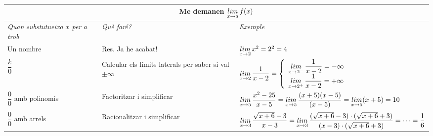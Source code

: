 \pagebreak
\begin{center}
	
	
	\setlength\LTleft{0pt}
	\setlength\LTright{0pt}
	\fontsize{10.5}{11}
	\def\arraystretch{1.8}
	\begin{longtable}[h]{|p{}|p{}|p{}|}
		\hline
		\multicolumn{3}{|c|}{Me demanen $\mathop{lim}\limits_{x\to a} f(x)$} \\  [1.5ex] \hline  
		\cellcolor{lightgray} \textit{Quan substutueixo $x$ per $a$ trob}  & \cellcolor{lightgray} \textit{Què faré?} & \cellcolor{lightgray} \textit{Exemple} \\  [1.5ex] \hline  
		Un nombre & Res. Ja he acabat! & $\mathop{lim}\limits_{x\to 2} x^2=2^2=4$\\  [1.5ex] \hline  
		$\dfrac{k}{0}$ & Calcular els límits laterals per saber si val $\pm \infty$ & $\mathop{lim}\limits_{x\to 2} \dfrac{1}{x-2}=\left\{\begin{array}{l} \mathop{lim}\limits_{x\to 2^-} \dfrac{1}{x-2}=-\infty \\  \mathop{lim}\limits_{x\to 2^+} \dfrac{1}{x-2}=+\infty \end{array}\right .$ \\[1.5ex] \hline  
		$\dfrac{0}{0}$ amb polinomis & Factoritzar i simplificar & $\mathop{lim}\limits_{x\to 5} \dfrac{x^2-25}{x-5}=\mathop{lim}\limits_{x\to 5} \dfrac{(x+5)(x-5)}{(x-5)}=\mathop{lim}\limits_{x\to 5} (x+5)=10$  \\  [1.5ex] \hline  
		$\dfrac{0}{0}$ amb arrels & Racionalitzar i simplificar & $\mathop{lim}\limits_{x\to 3} \dfrac{\sqrt{x+6}-3}{x-3}=\mathop{lim}\limits_{x\to 3} \dfrac{(\sqrt{x+6}-3)\cdot(\sqrt{x+6}+3)}{(x-3)\cdot(\sqrt{x+6}+3)}=\cdots=\dfrac{1}{6}$ \\  [1.5ex] \hline  
	\end{longtable}
\end{center}

